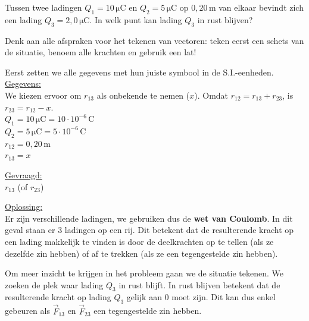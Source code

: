 \documentclass{ximera}
\begin{document}
\begin{example}[foldable=true,title={Voorbeeld: Drie ladingen op één lijn of lading in evenwicht}]\nl
    Tussen twee ladingen $Q_{1} = 10 \, \mathrm{\mu C}$ en $Q_{2} = 5 \, \mathrm{\mu C}$ op $0{,}20 \, \mathrm{m}$ van elkaar bevindt zich een lading $Q_{3} = 2{,}0 \, \mathrm{\mu C}$. In welk punt kan lading $Q_{3}$ in rust blijven?
    
    \begin{hint}
        Denk aan alle afspraken voor het tekenen van vectoren: teken eerst een schets van de situatie, benoem alle krachten en gebruik een lat!
    \end{hint}
    
    \begin{solution}\nl
        Eerst zetten we alle gegevens met hun juiste symbool in de S.I.-eenheden.\\[1ex]
        
        \underline{Gegevens:}\\
        We kiezen ervoor om $r_{13}$ als onbekende te nemen ($x$). Omdat $r_{12} = r_{13} + r_{23}$, is $r_{23} = r_{12} - x$.\\[1ex]
        $Q_{1} = 10 \, \mathrm{\mu C} = 10 \cdot 10^{-6} \, \mathrm{C}$\\
        $Q_{2} = 5 \, \mathrm{\mu C} = 5 \cdot 10^{-6} \, \mathrm{C}$\\
        $r_{12} = 0{,}20 \, \mathrm{m}$\\
        $r_{13} = x$
        
        \vspace{2ex}
        \underline{Gevraagd:}\\
        $r_{13}$ (of $r_{23}$)
        
        \vspace{2ex}
        \underline{Oplossing:}\\
        Er zijn verschillende ladingen, we gebruiken dus de \textbf{wet van Coulomb}. In dit geval staan er 3 ladingen op een rij. Dit betekent dat de resulterende kracht op een lading makkelijk te vinden is door de deelkrachten op te tellen (als ze dezelfde zin hebben) of af te trekken (als ze een tegengestelde zin hebben).
        
        Om meer inzicht te krijgen in het probleem gaan we de situatie tekenen. We zoeken de plek waar lading $Q_{3}$ in rust blijft. In rust blijven betekent dat de resulterende kracht op lading $Q_{3}$ gelijk aan 0 moet zijn. Dit kan dus enkel gebeuren als $\vec{F}_{13}$ en $\vec{F}_{23}$ een tegengestelde zin hebben. 
        

\end{solution}
\end{example}
\end{document}
